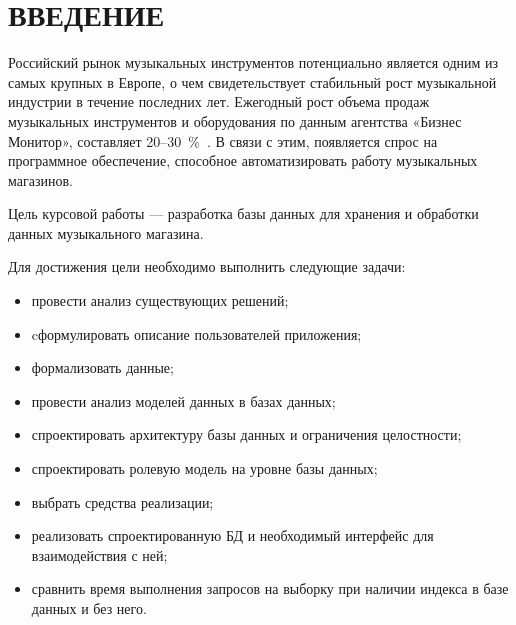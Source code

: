 \chapter*{ВВЕДЕНИЕ}

Российский рынок музыкальных инструментов потенциально является одним из самых крупных в Европе, о чем свидетельствует стабильный рост музыкальной индустрии в течение последних лет.
Ежегодный рост объема продаж музыкальных инструментов и оборудования по данным агентства «Бизнес Монитор», составляет 20--30~\%~\cite{intro}. В связи с этим, появляется спрос на программное обеспечение,
способное автоматизировать работу музыкальных магазинов.

Цель курсовой работы --- разработка базы данных для хранения и обработки данных музыкального магазина.

Для достижения цели необходимо выполнить следующие задачи:
\begin{itemize}
	\item провести анализ существующих решений;
	\item cформулировать описание пользователей приложения;
	\item формализовать данные;
	\item провести анализ моделей данных в базах данных;
	\item спроектировать архитектуру базы данных и ограничения целостности;
	\item спроектировать ролевую модель на уровне базы данных;
	\item выбрать средства реализации;
	\item реализовать спроектированную БД и необходимый интерфейс для взаимодействия с ней;
	\item сравнить время выполнения запросов на выборку при наличии индекса в базе данных и без него.
\end{itemize}
	
